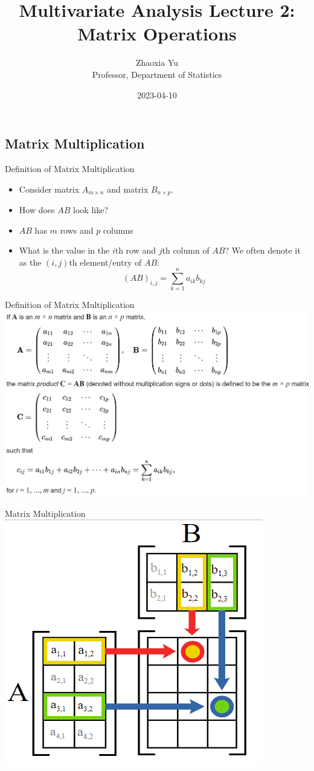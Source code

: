 \documentclass[
  ignorenonframetext,
]{beamer}
\title{Multivariate Analysis Lecture 2: Matrix Operations}
\author{Zhaoxia Yu\\
Professor, Department of Statistics}
\date{2023-04-10}
\providecommand{\tightlist}{%
  \setlength{\itemsep}{0pt}\setlength{\parskip}{0pt}}
\begin{document}
\frame{\titlepage}

\hypertarget{matrix-multiplication}{%
\subsection{Matrix Multiplication}\label{matrix-multiplication}}

\begin{frame}{Definition of Matrix Multiplication}
\protect\hypertarget{definition-of-matrix-multiplication}{}
\begin{itemize}
\tightlist
\item
  Consider matrix \(A_{m\times n}\) and matrix \(B_{n\times p}\).
\item
  How does \(AB\) look like?
\item
  \(AB\) has \(m\) rows and \(p\) columns
\item
  What is the value in the \(i\)th row and \(j\)th column of \(AB\)? We
  often denote it as the \((i,j)\)th element/entry of \(AB\):
  \[\left(AB\right)_{i,j}=\sum_{k=1}^n a_{ik}b_{kj}\]
\end{itemize}
\end{frame}

\begin{frame}{Definition of Matrix Multiplication}
\protect\hypertarget{definition-of-matrix-multiplication-1}{}
\includegraphics[width=0.9\linewidth]{img/MatrixMultiplicationWiki}
\end{frame}

\begin{frame}{Matrix Multiplication}
\protect\hypertarget{matrix-multiplication-1}{}
\includegraphics[width=0.5\linewidth]{img/MatrixMultiplication}
\end{frame}
\end{document}
